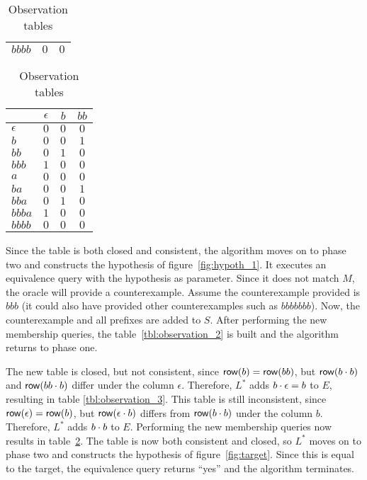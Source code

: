\begin{table}
\begin{subtable}[h]{.23\textwidth}
\begin{tabular}{ | l || c | c | }
$bbbb$     & $0$        & $0$ \\
\hline
\end{tabular}
\caption{} \label{tbl:observation_3}
\end{subtable}
%
%
\hfill
\begin{subtable}[h]{.23\textwidth}
\centering
\begin{tabular}{ | l || c | c | c | }
\hline
           & $\epsilon$ & $b$   & $bb$ \\ \hline \hline
$\epsilon$ & $0$        & $0$   & $0$  \\
$b$        & $0$        & $0$   & $1$  \\
$bb$       & $0$        & $1$   & $0$  \\
$bbb$      & $1$        & $0$   & $0$  \\ \hline \hline
$a$        & $0$        & $0$   & $0$  \\
$ba$       & $0$        & $0$   & $1$  \\
$bba$      & $0$        & $1$   & $0$  \\
$bbba$     & $1$        & $0$   & $0$  \\
$bbbb$     & $0$        & $0$   & $0$  \\
\hline
\end{tabular}
\caption{} \label{tbl:observation_4}
\end{subtable}
\caption{Observation tables}
\end{table}

Since the table is both closed and consistent, the algorithm moves on to phase two
and constructs the hypothesis of figure~\ref{fig:hypoth_1}. It executes an
equivalence query with the hypothesis as parameter. Since it does not match $M$,
the oracle will provide a counterexample. Assume the counterexample provided is
$bbb$ (it could also have provided other counterexamples such as $bbbbbbb$).
Now, the counterexample and all prefixes are added to $S$. After performing the
new membership queries, the table~\ref{tbl:observation_2} is built and the
algorithm returns to phase one.

The new table is closed, but not consistent, since $\mathsf{row}(b) = \mathsf{row}(bb)$, but
$\mathsf{row}(b \cdot b)$ and $\mathsf{row}(bb \cdot b)$ differ under the column $\epsilon$.
Therefore, $L^*$ adds $b \cdot \epsilon = b$ to $E$, resulting in table
\ref{tbl:observation_3}. This table is still inconsistent, since $\mathsf{row}(\epsilon)
= \mathsf{row}(b)$, but $\mathsf{row}(\epsilon \cdot b)$ differs from $\mathsf{row}(b \cdot b)$ under
the column $b$. Therefore, $L^*$ adds $b \cdot b$ to $E$. Performing the new
membership queries now results in table~\ref{tbl:observation_4}. The table is
now both consistent and closed, so $L^*$ moves on to phase two and constructs the
hypothesis of figure~\ref{fig:target}. Since this is equal to the target, the
equivalence query returns ``yes'' and the algorithm terminates.


